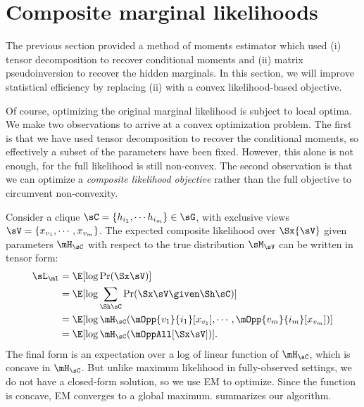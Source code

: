 \section{Composite marginal likelihoods}
\label{sec:piecewise}

The previous section provided a method of moments estimator
which used (i) tensor decomposition to recover conditional moments
and (ii) matrix pseudoinversion to recover the hidden marginals.
In this section, we will improve statistical efficiency by replacing (ii)
with a convex likelihood-based objective.

Of course, optimizing the original marginal likelihood is subject to local optima.
We make two observations to arrive at a convex optimization problem.
The first is that we have used tensor decomposition to recover the conditional moments,
so effectively a subset of the parameters have been fixed.
However, this alone is not enough, for the full likelihood is still non-convex.
The second observation is that we can optimize a \emph{composite likelihood objective} \cite{lindsay88composite}
rather than the full objective to circumvent non-convexity.


Consider a clique $\sC = \{h_{i_1}, \cdots h_{i_m}\} \in \sG$, with
  exclusive views $\sV = \{x_{v_1}, \cdots, x_{v_m}\}$. 
The expected composite likelihood over $\Sx{\sV}$ given parameters $\mH_\sC$
with respect to the true distribution $\sM_\sV$ can be written in tensor form:
\begin{align}
  \sL_\ml %
  &= \E[\log \Pr( \Sx \sV )] \nonumber \\
  &= \E[\log \sum_{\Sh \sC} \Pr( \Sx \sV \given \Sh \sC )] \nonumber \\
  &= \E[\log \mH_\sC(\mOpp{v_1}{i_1} [x_{v_1}], \cdots, \mOpp{v_m}{i_m} [x_{v_m}])] \nonumber \\
  &= \E[\log \mH_\sC(\mOppAll[\Sx\sV])]. \label{eqn:piecewise-obj}
\end{align}
The final form is an expectation over a log of linear function of $\mH_\sC$, which is concave in
$\mH_\sC$.  But unlike maximum likelihood in fully-observed settings,
we do not have a closed-form solution, so we use EM to optimize.
Since the function is concave, EM converges to a global maximum.
 summarizes our algorithm.

